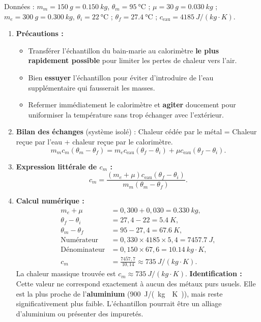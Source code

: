 \documentclass[11pt]{article}
\begin{document}
\begin{corrige}
Données : $m_m = \SI{150}{g} = \SI{0,150}{kg}$, $\theta_m = \SI{95}{\degreeCelsius}$ ; $\mu = \SI{30}{g} = \SI{0,030}{kg}$ ; $m_e = \SI{300}{g} = \SI{0,300}{kg}$, $\theta_i = \SI{22}{\degreeCelsius}$ ; $\theta_f = \SI{27,4}{\degreeCelsius}$ ; $c_{\text{eau}} = \SI{4185}{J/(kg\cdot K)}$.
\begin{enumerate}
\item \textbf{Précautions :}
  \begin{itemize}
  \item Transférer l'échantillon du bain-marie au calorimètre \textbf{le plus rapidement possible} pour limiter les pertes de chaleur vers l'air.
  \item Bien \textbf{essuyer} l'échantillon pour éviter d'introduire de l'eau supplémentaire qui fausserait les masses.
  \item Refermer immédiatement le calorimètre et \textbf{agiter} doucement pour uniformiser la température sans trop échanger avec l'extérieur.
  \end{itemize}
\item \textbf{Bilan des échanges} (système isolé) :
  Chaleur cédée par le métal = Chaleur reçue par l'eau + chaleur reçue par le calorimètre.
  \[
  m_m c_m (\theta_m - \theta_f) = m_e c_{\text{eau}} (\theta_f - \theta_i) + \mu c_{\text{eau}} (\theta_f - \theta_i).
  \]
\item \textbf{Expression littérale de $c_m$ :}
  \[
  c_m = \frac{(m_e + \mu) c_{\text{eau}} (\theta_f - \theta_i)}{m_m (\theta_m - \theta_f)}.
  \]
\item \textbf{Calcul numérique :}
  \begin{align*}
  m_e + \mu &= 0,300 + 0,030 = \SI{0,330}{kg}, \\
  \theta_f - \theta_i &= 27,4 - 22 = \SI{5,4}{K}, \\
  \theta_m - \theta_f &= 95 - 27,4 = \SI{67,6}{K}, \\
  \text{Numérateur} &= 0,330 \times 4185 \times 5,4 = \SI{7457,7}{J}, \\
  \text{Dénominateur} &= 0,150 \times 67,6 = \SI{10,14}{kg\cdot K}, \\
  c_m &= \frac{7457,7}{10,14} \approx \SI{735}{J/(kg\cdot K)}.
  \end{align*}
  La chaleur massique trouvée est \textbf{$c_m \approx \SI{735}{J/(kg\cdot K)}$}.
  \textbf{Identification :} Cette valeur ne correspond exactement à aucun des métaux purs usuels. Elle est la plus proche de l'\textbf{aluminium} (\SI{900}{J/(kg\cdot K)}), mais reste significativement plus faible. L'échantillon pourrait être un alliage d'aluminium ou présenter des impuretés.

\end{enumerate}
\end{corrige}
\end{document}
